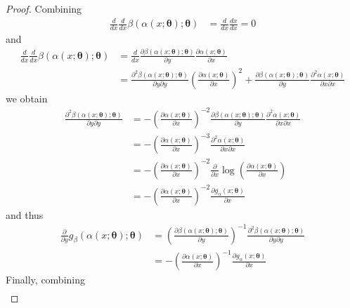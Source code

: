 \documentclass{article}
\begin{document}
\begin{proof}
    Combining
    \begin{align}
        \frac{d }{d x} \frac{d }{d x} \beta(\alpha(x; \bm \theta); \bm \theta) &= \frac{d }{d x} \frac{d x}{d x} = 0
    \end{align}
    and 
    \begin{align}
        \frac{d }{d x} \frac{d }{d x} \beta(\alpha(x; \bm \theta); \bm \theta) &= \frac{d}{dx} \frac{\partial \beta(\alpha(x; \bm \theta); \bm \theta)}{\partial y} \frac{\partial \alpha(x; \bm \theta)}{\partial x} \\
        &= \frac{\partial^{2} \beta(\alpha(x; \bm \theta); \bm \theta)}{\partial y\partial y} \left(\frac{\partial \alpha(x; \bm \theta)}{\partial x} \right)^{2} + \frac{\partial \beta(\alpha(x; \bm \theta); \bm \theta)}{\partial y} \frac{\partial^{2} \alpha(x; \bm \theta)}{\partial x \partial x} 
    \end{align}
    we obtain
    \begin{align}
    \frac{\partial^{2} \beta(\alpha(x; \bm \theta); \bm \theta)}{\partial y \partial y}
          &= - \left(\frac{\partial \alpha(x; \bm \theta)}{\partial x} \right)^{-2} \frac{\partial \beta(\alpha(x; \bm \theta); \bm \theta)}{\partial y} \frac{\partial^{2} \alpha(x; \bm \theta)}{\partial x \partial x} \\
          &= - \left(\frac{\partial \alpha(x; \bm \theta)}{\partial x} \right)^{-3} \frac{\partial^{2} \alpha(x; \bm \theta)}{\partial x \partial x}\\
          &= - \left(\frac{\partial \alpha(x; \bm \theta)}{\partial x} \right)^{-2} \frac{\partial}{\partial x} \log \left ( \frac{\partial \alpha(x; \bm \theta)}{\partial x}  \right)\\
          &= - \left(\frac{\partial \alpha(x; \bm \theta)}{\partial x} \right)^{-2} \frac{\partial g_{\alpha}(x; \bm \theta)}{\partial x}
    \end{align}
    and thus
    \begin{align}
        \frac{\partial}{\partial y} g_{\beta}(\alpha(x; \bm \theta); \bm \theta) 
        &= \left(\frac{\partial \beta(\alpha(x; \bm \theta); \bm \theta)}{\partial y} \right)^{-1} \frac{\partial^{2} \beta(\alpha(x; \bm \theta); \bm \theta)}{\partial y \partial y} \\
        &= - \left(\frac{\partial \alpha(x; \bm \theta)}{\partial x} \right)^{-1} \frac{\partial g_{\alpha}(x; \bm \theta)}{\partial x}
    \end{align}
    Finally, combining
    \begin{align}

\end{align}
\end{proof}
\end{document}
